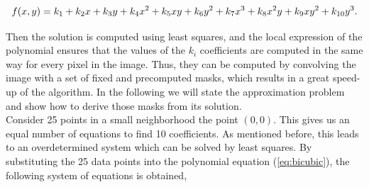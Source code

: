 \documentclass{ipol}
\numberwithin{equation}{section}
\numberwithin{table}{section}
\begin{document}
\begin{equation}
	\label{eq:bicubic}
	f(x,y) = k_1 + k_2x + k_3y + k_4x^2 + k_5xy + k_6y^2 + k_7x^3 + k_8x^2y + k_9xy^2 + k_{10}y^3. \\
\end{equation}


Then the solution is computed using least squares, and the local expression of the polynomial ensures that the values of the $k_i$ coefficients are computed in the same way for every pixel in the image. Thus, they can be computed by convolving the image with a set of fixed and precomputed masks, which results in a great speed-up of the algorithm. In the following we will state the approximation problem and show how to derive those masks from its solution.\\

Consider 25 points in a small neighborhood the point $(0,0)$. This gives us an equal number of equations to find 10 coefficients. As mentioned before, this leads to an overdetermined system which can be solved by least squares. 
By substituting the 25 data points into the polynomial equation (\ref{eq:bicubic}), the following system of 
equations is obtained,
\end{document}
